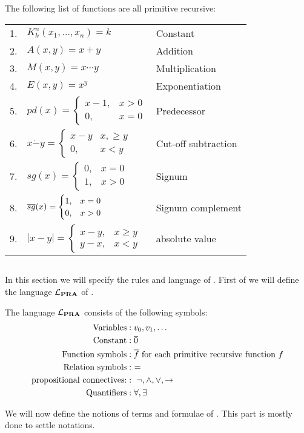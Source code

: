 \documentclass[../main.tex]{subfiles}
\begin{document}
\begin{prop}
	The following list of functions are all primitive recursive:
\begin{table}[!ht]
\begin{tabular}{p{1cm}p{6cm}p{5cm}}
	1.& $K^n_k(x_1,\ldots,x_n)=k$  & Constant  \\
	2.& $A(x,y)=x+y$ &Addition  \\
	3.&$M(x,y)=x\cdots y$  &Multiplication  \\
	4.&$E(x,y)=x^y$  &Exponentiation  \\
	5.&$pd(x)=\begin{cases}
		x-1, &x>0\\
		0,& x=0
	\end{cases}$&  Predecessor\\
		6.&$x\dot - y=\begin{cases}
			x-y&x,\geq y\\
			0,& x<y
		\end{cases}$  &Cut-off subtraction  \\
			7.&$sg(x)=\begin{cases}
				0,&x=0\\
				1,&x>0
			\end{cases}$& Signum \\
				8.& $\overline{sg}(x)=\begin{cases}
				1,&x=0\\
				0,&x>0
			\end{cases}$& Signum complement  \\
				9.& $|x-y|=\begin{cases}
				x-y,&x\geq y\\
				y-x,& x<y
			\end{cases}$& absolute value  \\
\end{tabular}
\end{table}
\end{prop}

\subsection{\PRA}
In this section we will specify the rules and language of \PRA. First of we
will define the language $\mathcal{L}_{\text{\textbf{PRA}}}$ of \PRA.

\begin{defi}
	The language $\mathcal{L}_{\text{\textbf{PRA}}}$ consists of the following symbols:
	\begin{align*}
		\text{Variables}&: v_0,v_1,\ldots \\
		\text{Constant} &: \overline{0}\\
		\text{Function symbols} &: \overline f\ \text{for each primitive
		recursive function}\ f\\
			\text{Relation symbols} &:\ =\\
			\text{propositional connectives:} &:\
			\neg,\wedge,\vee,\rightarrow\\
			\text{Quantifiers} &: \forall,\exists
	\end{align*}
\end{defi}
We will now define the notions of terms and formulae of \PRA. This part is
mostly done to settle notations.
\end{document}
